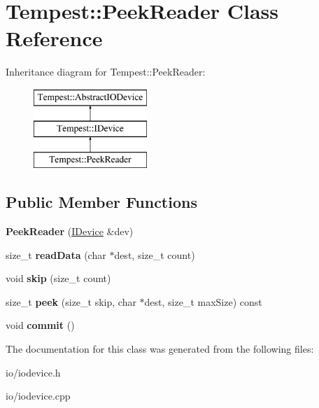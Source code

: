 \hypertarget{class_tempest_1_1_peek_reader}{\section{Tempest\+:\+:Peek\+Reader Class Reference}
\label{class_tempest_1_1_peek_reader}
}
Inheritance diagram for Tempest\+:\+:Peek\+Reader\+:\begin{figure}[H]
\begin{center}
\leavevmode
\includegraphics[height=3.000000cm]{class_tempest_1_1_peek_reader}
\end{center}
\end{figure}
\subsection*{Public Member Functions}
\begin{DoxyCompactItemize}
\item 
\hypertarget{class_tempest_1_1_peek_reader_aeb2b610e37af6d61ac5b0c699c7b9445}{{\bfseries Peek\+Reader} (\hyperlink{class_tempest_1_1_i_device}{I\+Device} \&dev)}\label{class_tempest_1_1_peek_reader_aeb2b610e37af6d61ac5b0c699c7b9445}

\item 
\hypertarget{class_tempest_1_1_peek_reader_a7cbf51179eaddff32afd2937361e5d6f}{size\+\_\+t {\bfseries read\+Data} (char $\ast$dest, size\+\_\+t count)}\label{class_tempest_1_1_peek_reader_a7cbf51179eaddff32afd2937361e5d6f}

\item 
\hypertarget{class_tempest_1_1_peek_reader_a216b1b925b95b4723cfb340516f277ba}{void {\bfseries skip} (size\+\_\+t count)}\label{class_tempest_1_1_peek_reader_a216b1b925b95b4723cfb340516f277ba}

\item 
\hypertarget{class_tempest_1_1_peek_reader_a4afa6af9db12f13ba044054e60413ba0}{size\+\_\+t {\bfseries peek} (size\+\_\+t skip, char $\ast$dest, size\+\_\+t max\+Size) const }\label{class_tempest_1_1_peek_reader_a4afa6af9db12f13ba044054e60413ba0}

\item 
\hypertarget{class_tempest_1_1_peek_reader_a31107d30204d2695e50cc481871d41bf}{void {\bfseries commit} ()}\label{class_tempest_1_1_peek_reader_a31107d30204d2695e50cc481871d41bf}

\end{DoxyCompactItemize}


The documentation for this class was generated from the following files\+:\begin{DoxyCompactItemize}
\item 
io/iodevice.\+h\item 
io/iodevice.\+cpp\end{DoxyCompactItemize}
